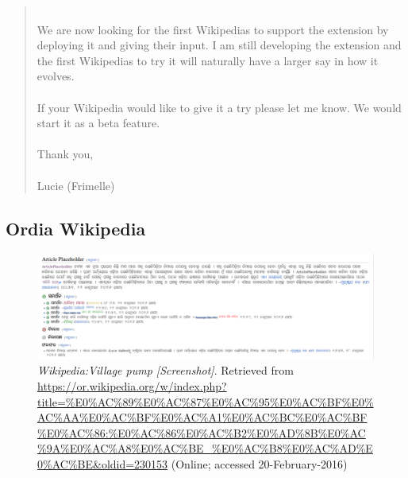 \begin{quote}
\\
We are now looking for the first Wikipedias to support the extension by deploying it and giving their input. I am still developing the extension and the first Wikipedias to try it will naturally have a larger say in how it evolves. \\
\\
If your Wikipedia would like to give it a try please let me know. We would start it as a beta feature. \\
\\
Thank you, \\
\\
Lucie (Frimelle)
\end{quote}
\citep{kaffee:01}

\subsection{Ordia Wikipedia}
\begin{figure}[H]
	\centering
	\includegraphics[width=\textwidth]{appendix/or-wiki.png}
	\caption[a figure]{\textit{Wikipedia:Village pump [Screenshot]}. Retrieved from \url{https://or.wikipedia.org/w/index.php?title=\%E0\%AC\%89\%E0\%AC\%87\%E0\%AC\%95\%E0\%AC\%BF\%E0\%AC\%AA\%E0\%AC\%BF\%E0\%AC\%A1\%E0\%AC\%BC\%E0\%AC\%BF\%E0\%AC\%86:\%E0\%AC\%86\%E0\%AC\%B2\%E0\%AD\%8B\%E0\%AC\%9A\%E0\%AC\%A8\%E0\%AC\%BE_\%E0\%AC\%B8\%E0\%AC\%AD\%E0\%AC\%BE&oldid=230153} (Online; accessed 20-February-2016)}
	\label{fig:orwiki}
\end{figure}

